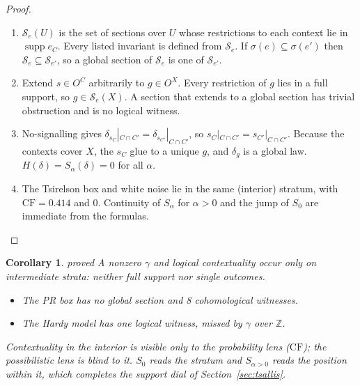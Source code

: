 \documentclass[11pt]{article}
\newtheorem{corollary}[theorem]{Corollary}
\theoremstyle{definition}
\theoremstyle{remark}
\newcommand{\Z}{\mathbb{Z}}
\newcommand{\CF}{\mathrm{CF}}
\newcommand{\st}[1]{\textsf{\small\color{gray}#1}}
\begin{document}
\begin{proof}
\begin{enumerate}
  \item $\mathcal S_e(U)$ is the set of sections over $U$ whose restrictions to each context lie in $\operatorname{supp}e_C$. Every listed invariant is defined from $\mathcal S_e$. If $\sigma(e)\subseteq\sigma(e')$ then $\mathcal S_e\subseteq\mathcal S_{e'}$, so a global section of $\mathcal S_e$ is one of $\mathcal S_{e'}$.
  \item Extend $s\in O^C$ arbitrarily to $g\in O^X$. Every restriction of $g$ lies in a full support, so $g\in\mathcal S_e(X)$. A section that extends to a global section has trivial obstruction and is no logical witness.
  \item No-signalling gives $\delta_{s_C}|_{C\cap C'}=\delta_{s_{C'}}|_{C\cap C'}$, so $s_C|_{C\cap C'}=s_{C'}|_{C\cap C'}$. Because the contexts cover $X$, the $s_C$ glue to a unique $g$, and $\delta_g$ is a global law. $H(\delta)=S_\alpha(\delta)=0$ for all $\alpha$.
  \item The Tsirelson box and white noise lie in the same (interior) stratum, with $\CF=0.414$ and $0$. Continuity of $S_\alpha$ for $\alpha>0$ and the jump of $S_0$ are immediate from the formulas.
\end{enumerate}
\end{proof}

\begin{corollary}\st{proved}
A nonzero $\gamma$ and logical contextuality occur only on \emph{intermediate} strata: neither full support nor single outcomes.
\begin{itemize}
  \item The PR box has no global section and 8 cohomological witnesses.
  \item The Hardy model has one logical witness, missed by $\gamma$ over $\Z$.
\end{itemize}
Contextuality in the interior is visible only to the probability lens ($\CF$); the possibilistic lens is blind to it. $S_0$ reads the stratum and $S_{\alpha>0}$ reads the position within it, which completes the support dial of Section~\ref{sec:tsallis}.
\end{corollary}
\end{document}
